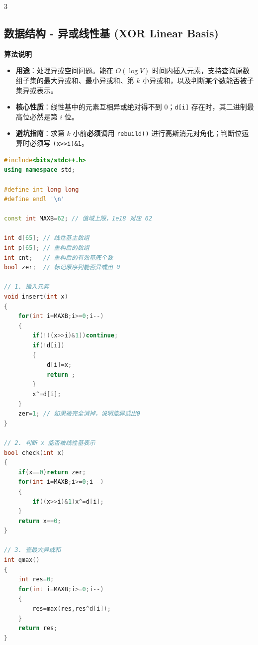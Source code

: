 \documentclass[10pt,landscape,a4paper]{article}
\begin{document}
\begin{multicols*}{3}
\subsection*{数据结构 - 异或线性基 (XOR Linear Basis)}
\par\addvspace{0.7ex}\noindent\textbf{算法说明}\par\nobreak
\begin{itemize}
\item \textbf{用途}：处理异或空间问题。能在 $O(\log V)$ 时间内插入元素，支持查询原数组子集的最大异或和、最小异或和、第 $k$ 小异或和，以及判断某个数能否被子集异或表示。
\item \textbf{核心性质}：线性基中的元素互相异或绝对得不到 0；\texttt{d\allowbreak{}[\allowbreak{}i\allowbreak{}]} 存在时，其二进制最高位必然是第 $i$ 位。
\item \textbf{避坑指南}：求第 $k$ 小前\textbf{必须}调用 \texttt{r\allowbreak{}e\allowbreak{}b\allowbreak{}u\allowbreak{}i\allowbreak{}l\allowbreak{}d\allowbreak{}(\allowbreak{})} 进行高斯消元对角化；判断位运算时必须写 \texttt{(\allowbreak{}x\allowbreak{}\textgreater{}\allowbreak{}\textgreater{}\allowbreak{}i\allowbreak{})\allowbreak{}\&\allowbreak{}1}。
\end{itemize}
\par{}\par
\begin{lstlisting}[language=C++]
#include<bits/stdc++.h>
using namespace std;

#define int long long
#define endl '\n'

const int MAXB=62; // 值域上限，1e18 对应 62

int d[65]; // 线性基主数组
int p[65]; // 重构后的数组
int cnt;   // 重构后的有效基底个数
bool zer;  // 标记原序列能否异或出 0

// 1. 插入元素
void insert(int x)
{
    for(int i=MAXB;i>=0;i--)
    {
        if(!((x>>i)&1))continue; 
        if(!d[i])
        {
            d[i]=x;
            return ;
        }
        x^=d[i];
    }
    zer=1; // 如果被完全消掉，说明能异或出0
}

// 2. 判断 x 能否被线性基表示
bool check(int x)
{
    if(x==0)return zer;
    for(int i=MAXB;i>=0;i--)
    {
        if((x>>i)&1)x^=d[i]; 
    }
    return x==0;
}

// 3. 查最大异或和
int qmax()
{
    int res=0;
    for(int i=MAXB;i>=0;i--)
    {
        res=max(res,res^d[i]);
    }
    return res;
}


\end{lstlisting}
\end{multicols*}
\end{document}
